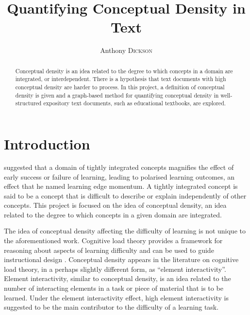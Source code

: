 \documentclass[12pt]{article}
\title{Quantifying Conceptual Density in Text}
\author{Anthony \textsc{Dickson}}
\theoremstyle{grammarstyle}
\begin{document}
\maketitle

\begin{abstract}
    Conceptual density is an idea related to the degree to which concepts in a domain are integrated, or interdependent.
    There is a hypothesis that text documents with high conceptual density are harder to process.
    In this project, a definition of conceptual density is given and a graph-based method for quantifying conceptual density in well-structured expository text documents, such as educational textbooks, are explored. 
\end{abstract}


\section{Introduction}
\cite{robins2010learning} suggested that a domain of tightly integrated concepts magnifies the effect of early success or failure of learning, leading to polarised learning outcomes, an effect that he named learning edge momentum. A tightly integrated concept is said to be a concept that is difficult to describe or explain independently of other concepts. This project is focused on the idea of conceptual density, an idea related to the degree to which concepts in a given domain are integrated.  


The idea of conceptual density affecting the difficulty of learning is not unique to the aforementioned work. Cognitive load theory provides a framework for reasoning about aspects of learning difficulty and can be used to guide instructional design \citep{sweller1994cognitive}. Conceptual density appears in the literature on cognitive load theory, in a perhaps slightly different form, as ``element interactivity''. Element interactivity, similar to conceptual density, is an idea related to the number of interacting elements in a task or piece of material that is to be learned. Under the element interactivity effect, high element interactivity is suggested to be the main contributor to the difficulty of a learning task.
\end{document}
